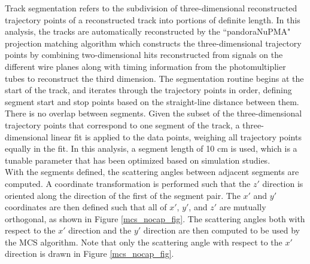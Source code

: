 \documentclass[a4paper,11pt]{article}
\begin{document}
Track segmentation refers to the subdivision of three-dimensional reconstructed trajectory points of a reconstructed track into portions of definite length. In this analysis, the tracks are automatically reconstructed by the ``pandoraNuPMA" projection matching algorithm which constructs the three-dimensional trajectory points by combining two-dimensional hits reconstructed from signals on the different wire planes along with timing information from the photomultiplier tubes to reconstruct the third dimension\cite{Marshall:2015rfa}. The segmentation routine begins at the start of the track, and iterates through the trajectory points in order, defining segment start and stop points based on the straight-line distance between them. There is no overlap between segments. Given the subset of the three-dimensional trajectory points that correspond to one segment of the track, a three-dimensional linear fit is applied to the data points, weighing all trajectory points equally in the fit. In this analysis, a segment length of 10 cm is used, which is a tunable parameter that has been optimized based on simulation studies.\\

With the segments defined, the scattering angles between adjacent segments are computed. A coordinate transformation is performed such that the $z'$ direction is oriented along the direction of the first of the segment pair. The $x'$ and $y'$ coordinates are then defined such that all of $x'$, $y'$, and $z'$ are mutually orthogonal, as shown in Figure \ref{mcs_nocap_fig}. The scattering angles both with respect to the $x'$ direction and the $y'$ direction are then computed to be used by the MCS algorithm. Note that only the scattering angle with respect to the $x'$ direction is drawn in Figure \ref{mcs_nocap_fig}.
\end{document}
